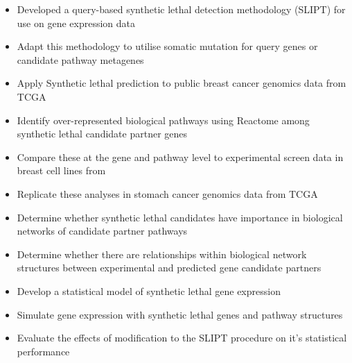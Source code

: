 \begin{itemize}

\item 

Developed a query-based synthetic lethal detection methodology (SLIPT) for use on gene expression data

\item 

Adapt this methodology to utilise somatic mutation for query genes or candidate pathway metagenes

\item 

Apply Synthetic lethal prediction to public breast cancer genomics data from TCGA \citep{TCGA2012}

\item 

Identify over-represented biological pathways using Reactome \citep{Reactome} among synthetic lethal candidate partner genes

\item

Compare these at the gene and pathway level to experimental screen data in breast cell lines from \citet{Telford2015}

\item

Replicate these analyses in stomach cancer genomics data from TCGA \citep{TCGA2014GC}

\item

Determine whether synthetic lethal candidates have importance in biological networks of candidate partner pathways 

\item

Determine whether there are relationships within biological network structures between experimental and predicted gene candidate partners 

\item

Develop a statistical model of synthetic lethal gene expression

\item

Simulate gene expression with synthetic lethal genes and pathway structures

\item

Evaluate the effects of modification to the SLIPT procedure on it's statistical performance


\end{itemize}
